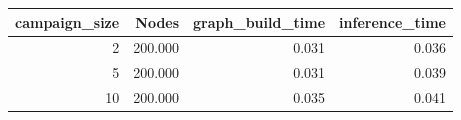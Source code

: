 \begin{tabular}{rrrr}
\toprule
campaign_size & Nodes & graph_build_time & inference_time \\
\midrule
2 & 200.000 & 0.031 & 0.036 \\
5 & 200.000 & 0.031 & 0.039 \\
10 & 200.000 & 0.035 & 0.041 \\
\bottomrule
\end{tabular}
